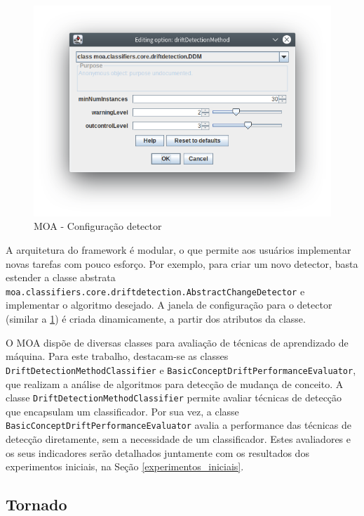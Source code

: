 \documentclass[qual, classic, a4paper]{ufbathesis}
\begin{document}
\begin{figure}[H]
\begin{center}
    \includegraphics[scale=1]{imagens/detector.png}
    \caption{MOA - Configuração detector}
    \label{fig:moa_detector}
\end{center}
\end{figure}

A arquitetura do framework é modular, o que permite aos usuários implementar novas tarefas com pouco esforço.
Por exemplo, para criar um novo detector, basta estender a classe abstrata \texttt{moa.classifiers.core.driftdetection.AbstractChangeDetector} e implementar o algoritmo desejado.
A janela de configuração para o detector (similar a \ref{fig:moa_detector}) é criada dinamicamente, a partir dos atributos da classe.

O MOA dispõe de diversas classes para avaliação de técnicas de aprendizado de máquina. 
Para este trabalho, destacam-se as classes \texttt{DriftDetectionMethodClassifier} e \texttt{BasicConceptDriftPerformanceEvaluator}, 
que realizam a análise de algoritmos para detecção de mudança de conceito.
A classe \texttt{DriftDetectionMethodClassifier} permite avaliar técnicas de detecção que encapsulam um classificador.
Por sua vez, a classe \texttt{BasicConceptDriftPerformanceEvaluator} avalia a performance das técnicas de detecção diretamente, 
sem a necessidade de um classificador.
Estes avaliadores e os seus indicadores serão detalhados juntamente com os resultados dos experimentos iniciais, na Seção \ref{experimentos_iniciais}.

\subsection{Tornado}
\end{document}
